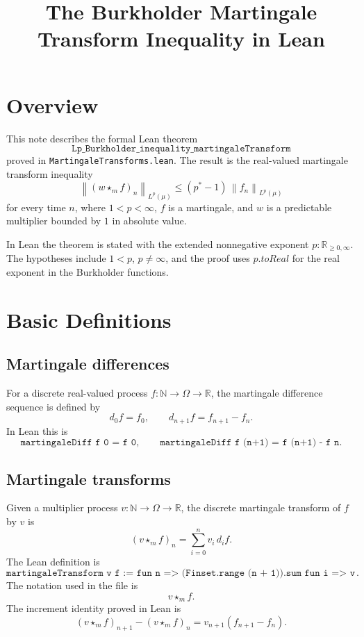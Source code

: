 \documentclass[11pt]{amsart}
\title{The Burkholder Martingale Transform Inequality in Lean}
\author{}
\date{}
\newcommand{\R}{\mathbb{R}}
\newcommand{\N}{\mathbb{N}}
\newcommand{\norm}[1]{\left\lVert #1 \right\rVert}
\begin{document}
\maketitle

\section{Overview}

This note describes the formal Lean theorem
\[
  \texttt{Lp\_Burkholder\_inequality\_martingaleTransform}
\]
proved in \texttt{MartingaleTransforms.lean}.  The result is the real-valued
martingale transform inequality
\[
  \norm{(w \star_m f)_n}_{L^p(\mu)}
    \le (p^\ast - 1)\,\norm{f_n}_{L^p(\mu)}
\]
for every time \(n\), where \(1 < p < \infty\), \(f\) is a martingale, and
\(w\) is a predictable multiplier bounded by \(1\) in absolute value.

In Lean the theorem is stated with the extended nonnegative exponent
\(p : \mathbb{R}_{\ge 0,\infty}\).  The hypotheses include \(1 < p\),
\(p \ne \infty\), and the proof uses \(p.toReal\) for the real exponent in
the Burkholder functions.

\section{Basic Definitions}

\subsection{Martingale differences}

For a discrete real-valued process \(f : \N \to \Omega \to \R\), the
martingale difference sequence is defined by
\[
  d_0 f = f_0,\qquad
  d_{n+1} f = f_{n+1} - f_n.
\]
In Lean this is
\[
\texttt{martingaleDiff f 0 = f 0},
\qquad
\texttt{martingaleDiff f (n+1) = f (n+1) - f n}.
\]

\subsection{Martingale transforms}

Given a multiplier process \(v : \N \to \Omega \to \R\), the discrete
martingale transform of \(f\) by \(v\) is
\[
  (v \star_m f)_n
    = \sum_{i=0}^n v_i\, d_i f.
\]
The Lean definition is
\[
\texttt{martingaleTransform v f :=
  fun n => (Finset.range (n + 1)).sum fun i => v i * martingaleDiff f i}.
\]
The notation used in the file is
\[
  v \star_m f.
\]
The increment identity proved in Lean is
\[
  (v \star_m f)_{n+1} - (v \star_m f)_n
    = v_{n+1}(f_{n+1}-f_n).
\]
\end{document}
